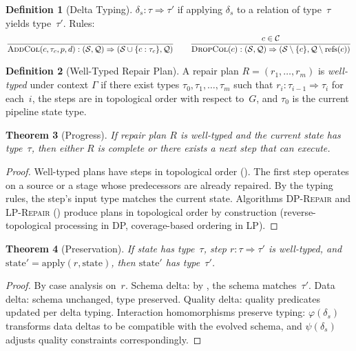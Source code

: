 \documentclass[11pt,a4paper]{article}
\newtheorem{theorem}{Theorem}[section]
\theoremstyle{definition}
\newtheorem{definition}[theorem]{Definition}
\begin{document}
\begin{definition}[Delta Typing]\label{def:delta-typing}
$\delta_s : \tau \Rightarrow \tau'$ if applying $\delta_s$ to a relation of
type~$\tau$ yields type~$\tau'$.  Rules:
\[
\frac{}{\textsc{AddCol}(c, \tau_c, p, d) : (\mathcal{S}, \mathcal{Q})
  \Rightarrow (\mathcal{S} \cup \{c : \tau_c\}, \mathcal{Q})}
\qquad
\frac{c \in \mathcal{C}}{\textsc{DropCol}(c) : (\mathcal{S}, \mathcal{Q})
  \Rightarrow (\mathcal{S} \setminus \{c\}, \mathcal{Q} \setminus \mathrm{refs}(c))}
\]
\end{definition}

\begin{definition}[Well-Typed Repair Plan]\label{def:welltyped-plan}
A repair plan $R = (r_1, \ldots, r_m)$ is \emph{well-typed} under context
$\Gamma$ if there exist types $\tau_0, \tau_1, \ldots, \tau_m$ such that
$r_i : \tau_{i-1} \Rightarrow \tau_i$ for each~$i$, the steps are in
topological order with respect to~$G$, and $\tau_0$ is the current pipeline
state type.
\end{definition}

\begin{theorem}[Progress]\label{thm:progress}
If repair plan $R$ is well-typed and the current state has type~$\tau$,
then either $R$ is complete or there exists a next step that can execute.
\end{theorem}

\begin{proof}
Well-typed plans have steps in topological order ().
The first step operates on a source or a stage whose predecessors are already
repaired.  By the typing rules, the step's input type matches the current
state.  Algorithms \textsc{DP-Repair} and \textsc{LP-Repair}
() produce plans in topological order by construction
(reverse-topological processing in DP, coverage-based ordering in LP).
\end{proof}

\begin{theorem}[Preservation]\label{thm:preservation}
If state has type~$\tau$, step $r : \tau \Rightarrow \tau'$ is well-typed,
and $\mathrm{state}' = \mathrm{apply}(r, \mathrm{state})$, then
$\mathrm{state}'$ has type~$\tau'$.
\end{theorem}

\begin{proof}
By case analysis on~$r$.  Schema delta: by , the
schema matches~$\tau'$.  Data delta: schema unchanged, type preserved.
Quality delta: quality predicates updated per delta typing.
Interaction homomorphisms preserve typing: $\varphi(\delta_s)$ transforms
data deltas to be compatible with the evolved schema, and $\psi(\delta_s)$
adjusts quality constraints correspondingly.
\end{proof}
\end{document}
